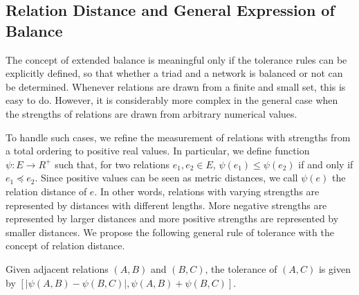 \documentclass[acmtweb]{acmsmall}
\begin{document}
\begin{table}[htbp!]
\end{table}

\subsection{Relation Distance and General Expression of Balance}
The concept of extended balance is meaningful only if the tolerance
rules can be explicitly defined, so that whether a triad and a network
is balanced or not can be determined. Whenever relations
are drawn from a finite and small set, this is easy to do. However, it
is considerably more complex in the general case when the strengths
of relations are drawn from arbitrary numerical values. 

To handle such cases, we refine the measurement of relations with
strengths from a total ordering to positive real values. In
particular, we define function $\psi: E \rightarrow R^{+}$ such that,
for two relations $e_{1}, e_{2} \in E$, $\psi(e_{1}) \leq \psi(e_{2})$
if and only if $e_{1} \preceq e_{2}$.  Since positive values can be
seen as metric distances, we call $\psi(e)$ the relation distance of
$e$.  In other words, relations with varying strengths are represented
by distances with different lengths.  More negative strengths are
represented by larger distances and more positive strengths are
represented by smaller distances. We propose the following general
rule of tolerance with the concept of relation distance.


\begin{definition} \label{def:gen_tolerance}
Given adjacent relations $(A,B)$ and $(B,C)$, the tolerance of $(A,C)$
is given by $[|\psi(A,B)-\psi(B,C)|, \psi(A,B)+\psi(B,C)]$.
\end{definition}
\end{document}
